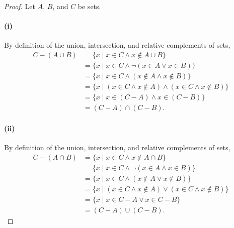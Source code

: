 \documentclass{report}
\begin{document}
  \begin{proof}

    Let $A$, $B$, and $C$ be sets.

    \paragraph{(i)}%

      By definition of the union, intersection, and relative complements of
        sets,
        \begin{align*}
          C - (A \cup B)
            & = \{ x \mid x \in C \land x \not\in A \cup B \} \\
            & = \{ x \mid x \in C \land \neg(x \in A \lor x \in B) \} \\
            & = \{ x \mid x \in C \land (x \not\in A \land x \not\in B) \} \\
            & = \{ x \mid (x \in C \land x \not\in A) \land
                          (x \in C \land x \not\in B) \} \\
            & = \{ x \mid x \in (C - A) \land x \in (C - B) \} \\
            & = (C - A) \cap (C - B).
        \end{align*}

    \paragraph{(ii)}%

      By definition of the union, intersection, and relative complements of
        sets,
        \begin{align*}
          C - (A \cap B)
            & = \{ x \mid x \in C \land x \not\in A \cap B \} \\
            & = \{ x \mid x \in C \land \neg(x \in A \land x \in B) \} \\
            & = \{ x \mid x \in C \land (x \not\in A \lor x \not\in B) \} \\
            & = \{ x \mid (x \in C \land x \not\in A) \lor
                          (x \in C \land x \not\in B) \} \\
            & = \{ x \mid x \in C - A \lor x \in C - B \} \\
            & = (C - A) \cup (C - B).
        \end{align*}

  \end{proof}

\subsection{}%
\end{document}
